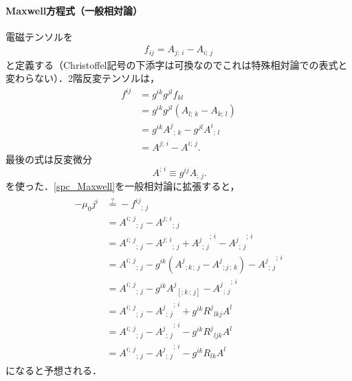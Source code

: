 \documentclass[a4paper]{ltjsreport}
\begin{document}
\paragraph{Maxwell方程式（一般相対論）}
電磁テンソルを
\begin{align}
  f_{ij}=A_{j;\,i} - A_{i;\,j}
\end{align}
と定義する（Christoffel記号の下添字は可換なのでこれは特殊相対論での表式と変わらない）．2階反変テンソルは，
\begin{align*}
  f^{ij} &= g^{ik}g^{jl}f_{kl}\\
  &= g^{ik}g^{jl}\left(A_{l;\,k} - A_{k;\,l}\right)\\
  &= g^{ik}{A^j}_{;\,k} - g^{jl}{A^i}_{;\,l}\\
  &= A^{j;\,i} - A^{i;\,j} .
\end{align*}
最後の式は反変微分
\[\,A^{;\,i}\equiv{g}^{ij}A_{;\,j}.\]
を使った．\eqref{spc_Maxwell}を一般相対論に拡張すると，
\begin{align}
  \begin{split}
    - \mu_0j^i &\stackrel{?}{=}  - {f^{ij}}_{;\,j}\\
    &= {A^{i;\,j}}_{;\,j} - {A^{j;\,i}}_{;\,j}\\
    &= {A^{i;\,j}}_{;\,j} - {A^{j;\,i}}_{;\,j} + {{A^j}_{;\,j}}^{;\,i} - {{A^j}_{;\,j}}^{;\,i}\\
    &= {A^{i;\,j}}_{;\,j} - g^{ik}\left({A^j}_{;k\,;\,j} - {A^j}_{;j\,;\,k}\right) - {{A^j}_{;\,j}}^{;\,i}\\
    &= {A^{i;\,j}}_{;\,j} - g^{ik}{A^j}_{\left[;k\,;\,j\right]} - {{A^j}_{;\,j}}^{;\,i}\\
    &= {A^{i;\,j}}_{;\,j} - {{A^j}_{;\,j}}^{;\,i} + g^{ik}{R^j}_{lkj}A^l\\
    &= {A^{i;\,j}}_{;\,j} - {{A^j}_{;\,j}}^{;\,i} - g^{ik}{R^j}_{ljk}A^l\\
    &= {A^{i;\,j}}_{;\,j} - {{A^j}_{;\,j}}^{;\,i} - g^{ik}{R}_{lk}A^l
  \end{split}
  \label{gen_Maxwell}
\end{align}
になると予想される．
\end{document}
